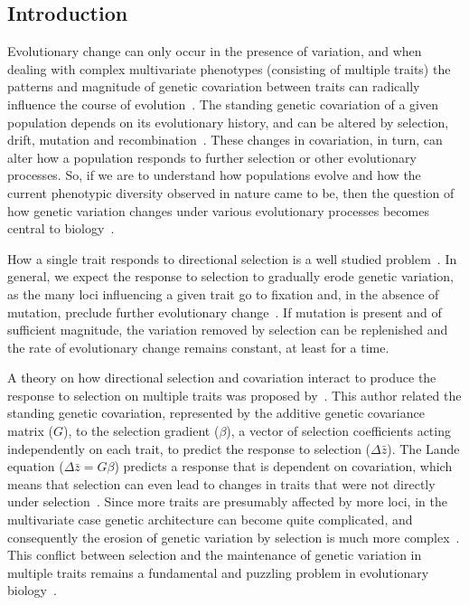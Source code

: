 \begin{refsection}

\section{Introduction}

Evolutionary change can only occur in the presence of variation, and
when dealing with complex multivariate phenotypes (consisting of
multiple traits) the patterns and magnitude of genetic covariation
between traits can radically influence the course of
evolution~\parencite{Lande1979-by, Felsenstein1988-ql}. The standing genetic
covariation of a given population depends on its evolutionary history,
and can be altered by selection, drift, mutation and
recombination~\parencite{Turelli1994-pg, Jones2004-be, Jones2014-wj}. These changes in
covariation, in turn, can alter how a population responds to further
selection or other evolutionary processes. So, if we are to understand
how populations evolve and how the current phenotypic diversity observed
in nature came to be, then the question of how genetic variation changes
under various evolutionary processes becomes central to
biology~\parencite{Mitchell-Olds2007-cx}.

How a single trait responds to directional selection is a well studied
problem~\parencite{Falconer1996-ot}. In general, we expect the response to
selection to gradually erode genetic variation, as the many loci
influencing a given trait go to fixation and, in the absence of
mutation, preclude further evolutionary change~\parencite{Bulmer1971-aa}. If
mutation is present and of sufficient magnitude, the variation removed
by selection can be replenished and the rate of evolutionary change
remains constant, at least for a time.

A theory on how directional selection and covariation interact to
produce the response to selection on multiple traits was proposed
by~\textcite{Lande1979-by}. This author related the standing genetic covariation,
represented by the additive genetic covariance matrix (\(G\)), to the
selection gradient (\(\beta\)), a vector of selection coefficients
acting independently on each trait, to predict the response to selection
(\(\Delta \bar{z}\)). The Lande equation (\(\Delta \bar{z} = G\beta\))
predicts a response that is dependent on covariation, which means that
selection can even lead to changes in traits that were not directly
under selection~\parencite{Cheverud1984-mi}. Since more traits are presumably
affected by more loci, in the multivariate case genetic architecture can
become quite complicated, and consequently the erosion of genetic
variation by selection is much more
complex~\parencite{Wolf2000-qk, Pavlicev2008-jy, Wagner2011-kp}. This conflict between
selection and the maintenance of genetic variation in multiple traits
remains a fundamental and puzzling problem in evolutionary
biology~\parencite{Walsh2009-cn}.


\end{refsection}
